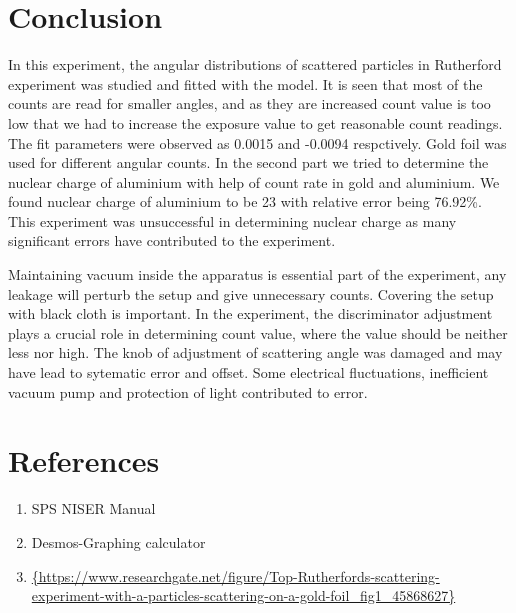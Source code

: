 \documentclass[a4paper, amsfonts, amssymb, amsmath, reprint, showkeys, nofootinbib, twoside]{revtex4-1}
\begin{document}
\section{Conclusion}
In this experiment, the angular distributions of scattered particles in Rutherford experiment was studied and fitted with the model. It is seen that most of the counts are read for smaller angles, and as they are increased count value is too low that we had to increase the exposure value to get reasonable count readings. The fit parameters were observed as 0.0015 and -0.0094 respctively. Gold foil was used for different angular counts. In the second part we tried to determine the nuclear charge of aluminium with help of count rate in gold and aluminium. We found nuclear charge of aluminium to be 23 with relative error being 76.92\%. This experiment was unsuccessful in determining nuclear charge as many significant errors have contributed to the experiment.

Maintaining vacuum inside the apparatus is essential part of the experiment, any leakage will perturb the setup and give unnecessary counts. Covering the setup with black cloth is important. In the experiment, the discriminator adjustment plays a crucial role in determining count value, where the value should be neither less nor high. The knob of adjustment of scattering angle was damaged and may have lead to sytematic error and offset. Some electrical fluctuations, inefficient vacuum pump and protection of light contributed to error.


\section{References}
\begin{enumerate}
\item{ SPS NISER Manual}
\item {Desmos-Graphing calculator }
\item\url{{https://www.researchgate.net/figure/Top-Rutherfords-scattering-experiment-with-a-particles-scattering-on-a-gold-foil_fig1_45868627}}
\end{enumerate}
\end{document}

